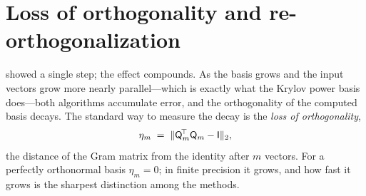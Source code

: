 \section{Loss of orthogonality and re-orthogonalization}
\label{sec:lossorthog}

 showed a single step; the effect compounds. As the basis grows and
the input vectors grow more nearly parallel---which is exactly what the Krylov power
basis does---both algorithms accumulate error, and the orthogonality of the computed
basis decays. The standard way to measure the decay is the \emph{loss of
orthogonality},
\[
  \eta_m \;=\; \lVert\mathsf{Q}_m^{\!\top}\mathsf{Q}_m - \mathsf{I}\rVert_2,
\]
the distance of the Gram matrix from the identity after $m$ vectors. For a perfectly
orthonormal basis $\eta_m = 0$; in finite precision it grows, and how fast it grows
is the sharpest distinction among the methods.

